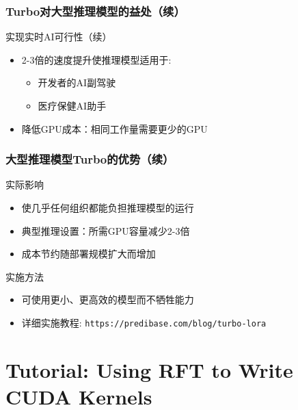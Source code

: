 \documentclass[aspectratio=169]{beamer}
\begin{document}
\begin{frame}[shrink=10]
	\frametitle{Turbo对大型推理模型的益处（续）}
	\begin{block}{实现实时AI可行性（续）}
		\begin{itemize}
			\item 2-3倍的速度提升使推理模型适用于:
			\begin{itemize}
				\item 开发者的AI副驾驶
				\item 医疗保健AI助手
			\end{itemize}
			\item 降低GPU成本：相同工作量需要更少的GPU
		\end{itemize}
	\end{block}
\end{frame}

\begin{frame}[shrink=10]
	\frametitle{大型推理模型Turbo的优势（续）}
	\begin{block}{实际影响}
		\begin{itemize}
			\item 使几乎任何组织都能负担推理模型的运行
			\item 典型推理设置：所需GPU容量减少2-3倍
			\item 成本节约随部署规模扩大而增加
		\end{itemize}
	\end{block}
	\begin{block}{实施方法}
		\begin{itemize}
			\item 可使用更小、更高效的模型而不牺牲能力
			\item 详细实施教程: \texttt{https://predibase.com/blog/turbo-lora}
		\end{itemize}
	\end{block}
\end{frame}

\section{Tutorial: Using RFT to Write CUDA Kernels}
\end{document}
